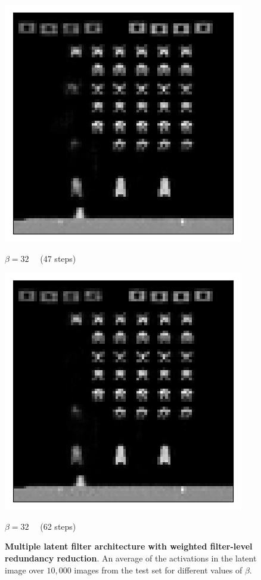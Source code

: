 \begin{figure}[h!]
\begin{multicols}{4}
    \includegraphics[scale=0.4]{figures/results/weighted_average/beta_32_posterior_sample_47.png}
    \caption{$\beta=32\quad$ (47 steps)}
    \includegraphics[scale=0.4]{figures/results/weighted_average/beta_32_posterior_sample_62.png}
    \caption{$\beta=32\quad$ (62 steps)}
\end{multicols}

\caption{\textbf{Multiple latent filter architecture with weighted filter-level redundancy reduction}. An average of the activations in the latent image over $10,000$ images from the test set for different values of $\beta$.}
\label{fig:weighted_average_posterior_samples}
\end{figure}



